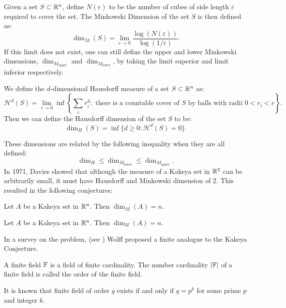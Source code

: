 \begin{definition}
Given a set $S \subset \mathbb R^n$, define $N(\varepsilon)$ to be the number of cubes of side length $\varepsilon$ required to cover the set.
The Minkowski Dimension of the set $S$ is then defined as:
$$\dim_M (S) = \lim_{\varepsilon \to 0} \frac{\log( N(\varepsilon))}{\log (1/\varepsilon)}.$$
If this limit does not exist, one can still define the upper and lower Minkowski dimensions, 
$\dim_{M_{\text{upper}}}$ and $\dim_{M_{\text{lower}}}$, by taking the limit superior and limit inferior respectively.
\end{definition}
\begin{definition}
    We define the $d$-dimensional Hausdorff measure of a set $S \subset \mathbb R^n$ as: 
    $$\mathcal{H}^d(S)=\lim_{r \to 0} \inf \left\{\sum_i r_i^d:\text{ there is a countable cover of } S\text{ by balls with radii } 0 < r_i < r\right\}.$$
    Then we can define the Hausdorff dimension of the set $S$ to be:
    $$\dim_H (S) = \inf \{ d \geq 0 : \mathcal{H}^d(S) = 0 \}.   $$
\end{definition}
These dimensions are related by the following inequality when they are all defined:
$$\dim_H \leq \dim_{M_{\text{lower}}} \leq \dim_{M_{\text{upper}}}.$$
In 1971, Davies showed that
although the measure of a Kakeya set in $\mathbb R^2$ can be arbitrarily small, it must have Hausdorff and Minkowski dimension of 2.\cite{davies1971some}
This resulted in the following conjectures:
\begin{conjecture}
    Let $A$ be a Kakeya set in $\mathbb R^n$. Then $\dim_M (A) = n$. \label{conj:mink-kakeya}
\end{conjecture}
\begin{conjecture}
    Let $A$ be a Kakeya set in $\mathbb R^n$. Then $\dim_H (A) = n$. \label{conj:haus-kakeya}
\end{conjecture}
In a survey on the problem, (see \cite{wolff1999recent} ) Wolff proposed a finite analogue to the Kakeya Conjecture.

\begin{definition}
    A finite field $\mathbb F$ is a field of finite cardinality. 
    The number cardinality $|\mathbb F|$ of a finite field is called the order of the finite field.
\end{definition}
It is known that finite field of order $q$ exists if and only if $q = p^k$ for some prime $p$ and integer $k$. 

